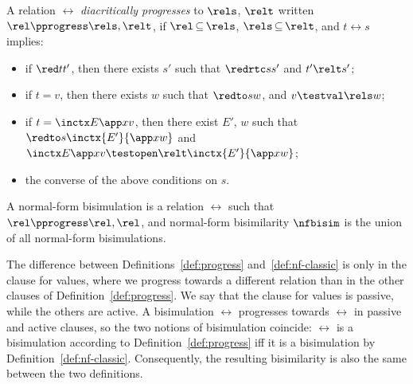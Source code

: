 \documentclass{lmcs}
\theoremstyle{defC}
\begin{document}
\begin{defi}%
  \label{def:progress}
  A relation $\rel$ \textit{diacritically progresses} to $\rels$, $\relt$ written
  $\rel \pprogress \rels, \relt$, if $\rel \mathop\subseteq \rels$, $\rels
  \mathop\subseteq \relt$, and $t \rel s$ implies:
  \begin{itemize}
  \item if $\red t {t'}$, then there exists $s'$ such that $\redrtc s {s'}$ and
    $t' \relt s'$;
  \item if $t=v$, then there exists $w$ such that $\redto s w$, and $v
    \testval\rels w$;
  \item if $t=\inctx E {\app x v}$, then there exist $E'$, $w$ such that $\redto
    s {\inctx {E'}{\app x w}}$ and $\inctx E {\app x v} \testopen\relt \inctx
    {E'}{\app x w}$;
    \item the converse of the above conditions on $s$.
  \end{itemize}
  A normal-form bisimulation is a relation $\rel$ such that $\rel \pprogress
  \rel, \rel$, and normal-form bisimilarity $\nfbisim$ is the union of all
  normal-form bisimulations.
\end{defi}
The difference between Definitions~\ref{def:progress} and~\ref{def:nf-classic}
is only in the clause for values, where we progress towards a different relation
than in the other clauses of Definition~\ref{def:progress}. We say that the
clause for values is passive, while the others are active. A bisimulation $\rel$
progresses towards $\rel$ in passive and active clauses, so the two notions of
bisimulation coincide: $\rel$ is a bisimulation according to
Definition~\ref{def:progress} iff it is a bisimulation by
Definition~\ref{def:nf-classic}. Consequently, the resulting bisimilarity is
also the same between the two definitions.
\end{document}
